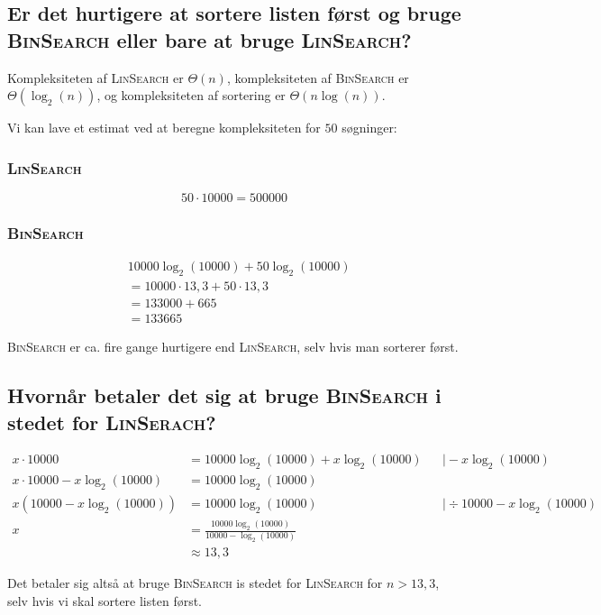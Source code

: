 \subsection{Er det hurtigere at sortere listen først og bruge \textsc{BinSearch} eller bare at bruge
\textsc{LinSearch}?}
\label{subsec:er-det-hurtigere-at-sortere-listen-frst-og-bruge-binsearch-eller-bare-at-bruge-linsearch}

Kompleksiteten af \textsc{LinSearch} er \(\Theta(n)\), kompleksiteten af \textsc{BinSearch} er\(\Theta(\log_{2}(n))\),
og kompleksiteten af sortering er \(\Theta(n\log(n))\).

Vi kan lave et estimat ved at beregne kompleksiteten for \(50\) søgninger:

\subsubsection{\textsc{LinSearch}}

\begin{equation}
    50 \cdot 10000 = 500000
    \label{eq:equation16}
\end{equation}

\subsubsection{\textsc{BinSearch}}

\begin{equation}
    \begin{aligned}
        & 10000 \log_{2}(10000) + 50 \log_{2}(10000) \\
        & = 10000 \cdot 13,3 + 50 \cdot 13,3 \\
        & = 133000 + 665 \\
        & = 133665
    \end{aligned}
    \label{eq:equation17}
\end{equation}

\textsc{BinSearch} er ca. fire gange hurtigere end \textsc{LinSearch}, selv hvis man sorterer først.

\subsection{Hvornår betaler det sig at bruge \textsc{BinSearch} i stedet for \textsc{LinSerach}?}
\label{subsec:hvornar-betaler-det-sig-at-bruge-binsearch-i-stedet-for-linserach}

\begin{equation}
    \begin{aligned}
        x \cdot 10000 & = 10000 \log_{2}(10000) + x \log_{2}(10000) && \mid - x \log_{2}(10000) \\
        x \cdot 10000 - x \log_{2}(10000) & = 10000 \log_{2}(10000) \\
        x (10000 - x \log_{2}(10000)) & = 10000 \log_{2}(10000) && \mid \div 10000 - x \log_{2}(10000) \\
        x & = \frac{10000 \log_{2}(10000)}{10000 - \log_{2}(10000)} \\
        & \approx 13,3
    \end{aligned}
    \label{eq:equation15}
\end{equation}

Det betaler sig altså at bruge \textsc{BinSearch} is stedet for \textsc{LinSearch} for \(n > 13,3\), selv hvis vi skal
sortere listen først.
